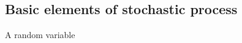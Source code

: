 \documentclass[\main/main.tex]{subfiles}
\begin{document}
\subsection{Basic elements of stochastic process}

A random variable 
\end{document}
